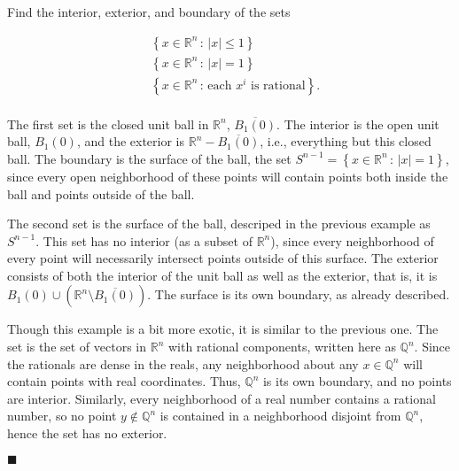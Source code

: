 \documentclass[12pt]{article}
\renewcommand{\qed}{\hfill$\blacksquare$}
\renewenvironment{proof}{\begin{addmargin}[1em]{0em}\begin{newproof}}{\end{newproof}\end{addmargin}\qed}
\newenvironment{problem}[2][Problem]{\begin{trivlist}
\item[\hskip \labelsep {\bfseries #1}\hskip \labelsep {\bfseries #2.}]}{\end{trivlist}}
\begin{document}
\begin{problem}{1-16}
Find the interior, exterior, and boundary of the sets 

	\begin{align*}
	& \left\{ x \in \mathbb{R}^n \, : \, \left|x\right| \leq 1 \right\} \\
	& \left\{ x \in \mathbb{R}^n \, : \, \left|x\right| = 1 \right\} \\
	& \left\{ x \in \mathbb{R}^n \, : \, \text{each } x^i \text{ is rational} \right\}. \\
	\end{align*}
\end{problem}
\begin{proof}
The first set is the closed unit ball in $\mathbb{R}^n$, $\overline{B_1\left(0\right)}$. The interior is the open unit ball, $B_1\left(0\right)$, and the exterior is $\mathbb{R}^n - \overline{B_1\left(0\right)}$, i.e., everything but this closed ball. The boundary is the surface of the ball, the set $S^{n-1} = \left\{ x \in \mathbb{R}^n \, : \, \left|x\right| = 1 \right\}$, since every open neighborhood of these points will contain points both inside the ball and points outside of the ball.

The second set is the surface of the ball, descriped in the previous example as $S^{n-1}$. This set has no interior (as a subset of $\mathbb{R}^n$), since every neighborhood of every point will necessarily intersect points outside of this surface. The exterior consists of both the interior of the unit ball as well as the exterior, that is, it is $ B_1\left(0\right) \cup \left(\mathbb{R}^n \setminus \overline{B_1\left(0\right)}\right)$. The surface is its own boundary, as already described.

Though this example is a bit more exotic, it is similar to the previous one. The set is the set of vectors in $\mathbb{R}^n$ with rational components, written here as $\mathbb{Q}^n$. Since the rationals are dense in the reals, any neighborhood about any $x \in \mathbb{Q}^n$ will contain points with real coordinates. Thus, $\mathbb{Q}^n$ is its own boundary, and no points are interior. Similarly, every neighborhood of a real number contains a rational number, so no point $y \notin \mathbb{Q}^n$ is contained in a neighborhood disjoint from $\mathbb{Q}^n$, hence the set has no exterior.
\end{proof} 
 
 
 
 
 
 
 
\end{document}
